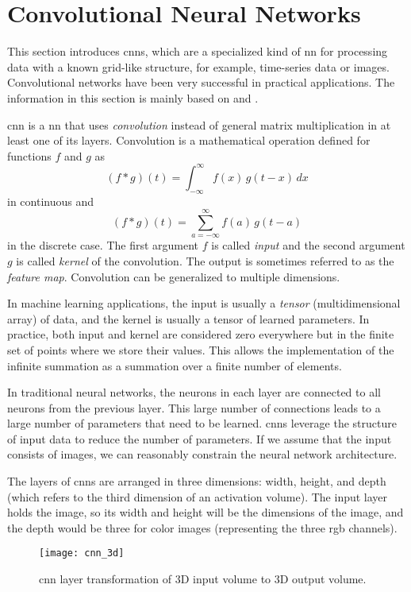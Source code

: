 \section{Convolutional Neural Networks}\label{s:cnns}

This section introduces \glspl{cnn}, which are a specialized kind of \gls{nn} for processing data with a known grid-like structure, for example, time-series data or images. Convolutional networks have been very successful in practical applications. The information in this section is mainly based on \cite{Goodfellow-et-al-2016} and \cite{cs231n}.

\Gls{cnn} is a \gls{nn} that uses \textit{convolution} instead of general matrix multiplication in at least one of its layers.  Convolution is a mathematical operation defined for functions $f$ and $g$ as
$$
(f * g)(t) = \int_{-\infty}^\infty f(x)\, g(t - x)\, dx
$$
in continuous and
$$
(f * g)(t) = \sum_{a=-\infty}^\infty f(a)\, g(t - a)
$$
in the discrete case. The first argument $f$ is called \textit{input} and the second argument $g$ is called \textit{kernel} of the convolution. The output is sometimes referred to as the \textit{feature map}. Convolution can be generalized to multiple dimensions.

In machine learning applications, the input is usually a \textit{tensor} (multidimensional array) of data, and the kernel is usually a tensor of learned parameters. In practice, both input and kernel are considered zero everywhere but in the finite set of points where we store their values. This allows the implementation of the infinite summation as a summation over a finite number of elements.

In traditional neural networks, the neurons in each layer are connected to all neurons from the previous layer. This large number of connections leads to a large number of parameters that need to be learned. \Glspl{cnn} leverage the structure of input data to reduce the number of parameters. If we assume that the input consists of images, we can reasonably constrain the neural network architecture.

The layers of \glspl{cnn} are arranged in three dimensions: width, height, and depth (which refers to the third dimension of an activation volume). The input layer holds the image, so its width and height will be the dimensions of the image, and the depth would be three for color images (representing the three \gls{rgb} channels).

\begin{figure}[ht]
\centering
\texttt{[image: cnn\_3d]}
\caption[\acrshort{cnn} layer transformation of 3D input volume to 3D output volume.]{\Gls{cnn} layer transformation of 3D input volume to 3D output volume.\cite{cs231n}}
\label{fig:cnn_transform}
\end{figure}


